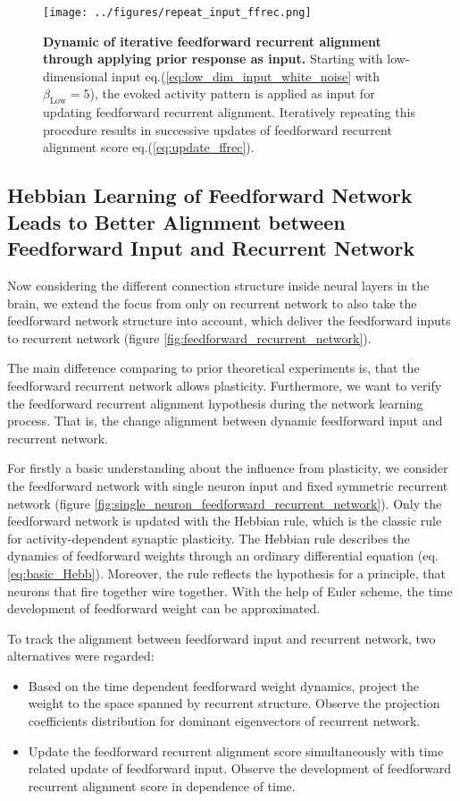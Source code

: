 \documentclass[11pt]{article}
\begin{document}
	\begin{figure}
		\centering
		\caption{\textbf{Dynamic of iterative feedforward recurrent alignment through applying prior response as input.} Starting with low-dimensional input eq.(\ref{eq:low_dim_input_white_noise} with $\beta_{\text{Low}} = 5$), the evoked activity pattern is applied as input for updating feedforward recurrent alignment. Iteratively repeating this procedure results in successive updates of feedforward recurrent alignment score eq.(\ref{eq:update_ffrec}).}
		\texttt{[image: ../figures/repeat\_input\_ffrec.png]}
		\label{fig:ffrec_repeat_input}
	\end{figure}
	\null
	\vfill
	
	\clearpage
	\subsection{Hebbian Learning of Feedforward Network Leads to Better Alignment between Feedforward Input and Recurrent Network}
	
	Now considering the different connection structure inside neural layers in the brain, we extend the focus from only on recurrent network to also take the feedforward network structure into account, which deliver the feedforward inputs to recurrent network (figure \ref{fig:feedforward_recurrent_network}). 
	
	The main difference comparing to prior theoretical experiments is, that the feedforward recurrent network allows plasticity. Furthermore, we want to verify the feedforward recurrent alignment hypothesis during the network learning process. That is, the change alignment between dynamic feedforward input and recurrent network. 
	
	For firstly a basic understanding about the influence from plasticity, we consider the feedforward network with single neuron input and fixed symmetric recurrent network (figure \ref{fig:single_neuron_feedforward_recurrent_network}). Only the feedforward network is updated with the Hebbian rule, which is the classic rule for activity-dependent synaptic plasticity. The Hebbian rule describes the dynamics of feedforward weights through an ordinary differential equation (eq. \ref{eq:basic_Hebb}). Moreover, the rule reflects the hypothesis for a principle, that neurons that fire together wire together. With the help of Euler scheme, the time development of feedforward weight can be approximated. 
	
	To track the alignment between feedforward input and recurrent network, two alternatives were regarded:
		\begin{itemize}
			\item Based on the time dependent feedforward weight dynamics, project the weight to the space spanned by recurrent structure. Observe the projection coefficients distribution for dominant eigenvectors of recurrent network.
			\item Update the feedforward recurrent alignment score simultaneously with time related update of feedforward input. Observe the development of feedforward recurrent alignment score in dependence of time. 
		\end{itemize}
\end{document}
